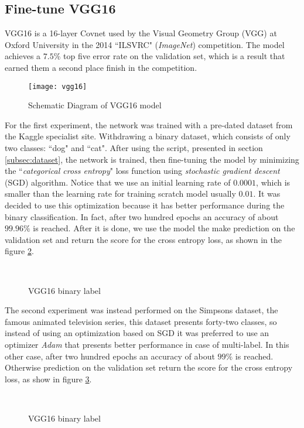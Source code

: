 \subsection{Fine-tune VGG16} 
\label{subsec:vgg16}
VGG16 is a 16-layer Covnet used by the Visual Geometry Group (VGG) at Oxford 
University in the 2014 ``ILSVRC" (\emph{ImageNet}) competition. 
The model achieves a $7.5\%$ top five error rate on the validation set, which 
is a result that earned them a second place finish in the competition.
%
\begin{figure}[htb]
\centering
\texttt{[image: vgg16]}
\caption{Schematic Diagram of VGG16 model}
\label{fig:vgg16schema}
\end{figure}
%
For the first experiment, the network was trained with a pre-dated dataset from 
the Kaggle specialist site. 
Withdrawing a binary dataset, which consists of only two classes: 
``dog" and ``cat".
After using the script, presented in section \ref {subsec:dataset}, the network
is trained, then fine-tuning the model by minimizing the ``\emph{categorical 
cross entropy}" loss function using \emph {stochastic gradient descent} (SGD) 
algorithm.
Notice that we use an initial learning
rate of $0.0001$, which is smaller than the learning rate for training scratch
model usually $0.01$.
It was decided to use this optimization because it has better performance 
during the binary classification.
In fact, after two hundred epochs an accuracy of about $99.96\%$ is reached. 
After it is done, we use the model the make prediction on the validation set 
and return the score for the cross entropy loss, as shown in the 
figure \ref{fig:vgg16resultbin}.
\begin{figure}[thb]
 \quad
{} \\
\caption{VGG16 binary label}
\label{fig:vgg16resultbin}
\end{figure}
%
The second experiment was instead performed on the Simpsons dataset, the famous 
animated television series, this dataset presents forty-two classes, so instead of 
using an optimization based on SGD it was preferred to use an optimizer 
\emph{Adam} that presents better performance in case of multi-label.
In this other case, after two hundred epochs an accuracy of about $99\%$ is 
reached.
Otherwise prediction on the validation set return the score for the cross 
entropy loss, as show in figure \ref{fig:vgg16resultmulti}.
\begin{figure}[htb]
 \quad
{} \\
\caption{VGG16 binary label}
\label{fig:vgg16resultmulti}
\end{figure}
%
